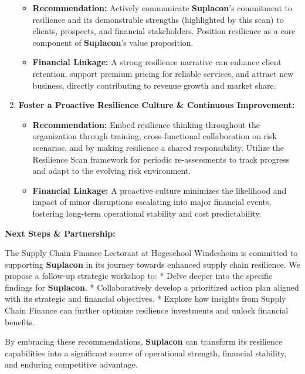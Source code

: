\documentclass[
  oneside,
  open=any,
  fontsize=11pt]{scrbook}
\providecommand{\tightlist}{%
  \setlength{\itemsep}{0pt}\setlength{\parskip}{0pt}}
\begin{document}
\begin{enumerate}
  \begin{itemize}
  \tightlist
  \item
    \textbf{Recommendation:} Actively communicate \textbf{Suplacon}'s
    commitment to resilience and its demonstrable strengths (highlighted
    by this scan) to clients, prospects, and financial stakeholders.
    Position resilience as a core component of \textbf{Suplacon}'s value
    proposition.
  \item
    \textbf{Financial Linkage:} A strong resilience narrative can
    enhance client retention, support premium pricing for reliable
    services, and attract new business, directly contributing to revenue
    growth and market share.
  \end{itemize}
\item
  \textbf{Foster a Proactive Resilience Culture \& Continuous
  Improvement:}

  \begin{itemize}
  \tightlist
  \item
    \textbf{Recommendation:} Embed resilience thinking throughout the
    organization through training, cross-functional collaboration on
    risk scenarios, and by making resilience a shared responsibility.
    Utilize the Resilience Scan framework for periodic re-assessments to
    track progress and adapt to the evolving risk environment.
  \item
    \textbf{Financial Linkage:} A proactive culture minimizes the
    likelihood and impact of minor disruptions escalating into major
    financial events, fostering long-term operational stability and cost
    predictability.
  \end{itemize}
\end{enumerate}

\textbf{Next Steps \& Partnership:}

The Supply Chain Finance Lectoraat at Hogeschool Windesheim is committed
to supporting \textbf{Suplacon} in its journey towards enhanced supply
chain resilience. We propose a follow-up strategic workshop to: * Delve
deeper into the specific findings for \textbf{Suplacon}. *
Collaboratively develop a prioritized action plan aligned with its
strategic and financial objectives. * Explore how insights from Supply
Chain Finance can further optimize resilience investments and unlock
financial benefits.

By embracing these recommendations, \textbf{Suplacon} can transform its
resilience capabilities into a significant source of operational
strength, financial stability, and enduring competitive advantage.
\end{document}
